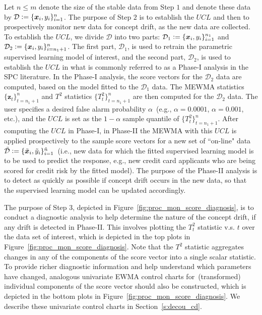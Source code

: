 \documentclass[twoside,11pt]{article}
\begin{document}
Let $n\leq m$ denote the size of the stable data from Step $1$ and denote these data by $\mathcal{D} \vcentcolon=\{\bm {x}_i, y_i\} _{i=1} ^{n}$. The purpose of Step $2$ is to establish the $UCL$  and then to prospectively monitor new data for concept drift, as the new data are collected. To establish the $UCL$, we divide $\mathcal{D}$ into two parts: $ \mathcal{D}_1 \vcentcolon= \{\bm {x}_i, y_i\} _{i=1} ^{n_1}$ and $\mathcal{D}_2 \vcentcolon= \{\bm {x}_i, y_i\} _{i=n_1+1} ^{n}$. The first part, $\mathcal{D}_1$, is used to retrain the parametric supervised learning model of interest, and the second part, $\mathcal{D}_2$, is used to establish the $UCL$ in what is commonly referred to as a Phase-I analysis in the SPC literature. In the Phase-I analysis, the score vectors for the $\mathcal{D}_2$ data are computed, based on the model fitted to the $\mathcal{D}_1$ data. The MEWMA statistics $\{\bm{z}_t\}_{t=n_1+1}^n$ and $T^2$ statistics $\{T_t^2\}_{t=n_1+1}^n$ are then computed for the $\mathcal{D}_2$ data. The user specifies a desired false alarm probability $\alpha$~(e.g., $\alpha=0.0001$, $\alpha=0.001$, etc.), and the $UCL$ is set as the $1-\alpha$ sample quantile of $\{T_t^2\}_{t=n_1+1}^n$. After computing the $UCL$ in Phase-I, in Phase-II the MEWMA with this $UCL$ is applied prospectively to the sample score vectors for a new set of ``on-line" data $\tilde{\mathcal{D}}\vcentcolon=\{\tilde{\bm{x}}_i,\tilde{y}_i\}_{i = 1}^{\tilde{n}}$~(i.e., new data for which the fitted supervised learning model is to be used to predict the response, e.g., new credit card applicants who are being scored for credit risk by the fitted model). The purpose of the Phase-II analysis is to detect as quickly as possible if concept drift occurs in the new data, so that the supervised learning model can be updated accordingly. 

The purpose of Step $3$, depicted in Figure~\ref{fig:proc_mon_score_diagnosis}, is to conduct a diagnostic analysis to help determine the nature of the concept drift, if any drift is detected in Phase-II. This involves plotting the $T_t^2$ statistic v.s. $t$ over the data set of interest, which is depicted in the top plots in Figure~\ref{fig:proc_mon_score_diagnosis}. Note that the $T^2$ statistic aggregates changes in any of the components of the score vector into a single scalar statistic. To provide richer diagnostic information and help understand which parameters have changed, analogous univariate EWMA control charts for~(transformed) individual components of the score vector should also be constructed, which is depicted in the bottom plots in Figure~\ref{fig:proc_mon_score_diagnosis}. We describe these univariate control charts in Section~\ref{s:decou_cd}.
\end{document}
